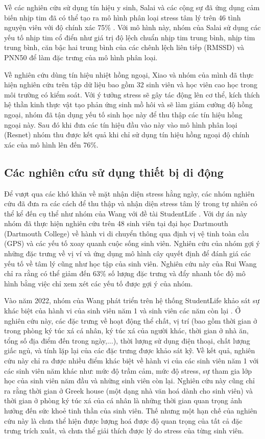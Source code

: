 Về các nghiên cứu sử dụng tín hiệu y sinh, Salai và các cộng sự đã ứng dụng cảm biến nhịp tim đã có thể tạo ra mô hình phân loại stress tâm lý trên 46 tình nguyện viên với độ chính xác 75\% \cite{stress_heartrate}. Với mô hình này, nhóm của Salai sử dụng các yếu tố nhịp tim cổ điển như giá trị độ lệch chuẩn nhịp tim trung bình, nhịp tim trung bình, căn bậc hai trung bình của các chênh lệch liên tiếp (RMSSD) và PNN50 để làm đặc trưng của mô hình phân loại.

Về nghiên cứu dùng tín hiệu nhiệt hồng ngoại, Xiao và nhóm của mình đã thực hiện nghiên cứu trên tập dữ liệu bao gồm 32 sinh viên và học viên cao học \cite{Stress_thermo} trong môi trường có kiểm soát. Với ý tưởng stress sẽ gây tác động lên cơ thể, kích thích hệ thần kinh thực vật tạo phản ứng sinh mồ hôi và sẽ làm giảm cường độ hồng ngoại, nhóm đã tận dụng yếu tố sinh học này để thu thập các tín hiệu hồng ngoại này. Sau đó khi đưa các tín hiệu đầu vào này vào mô hình phân loại (Resnet) nhóm thu được kết quả khi chỉ sử dụng tín hiệu hồng ngoại độ chính xác của mô hình lên đến 76\%.

\subsection{Các nghiên cứu sử dụng thiết bị di động}
Để vượt qua các khó khăn về mặt nhận diện stress hằng ngày, các nhóm nghiên cứu \cite{student_life,student_life2,Muller,student_life4} đã đưa ra các cách để thu thập và nhận diện stress tâm lý trong tự nhiên có thể kể đến cụ thể như nhóm của Wang với đề tài StudentLife \cite{student_life}. Với dự án này nhóm đã thực hiện nghiên cứu trên 48 sinh viên tại đại học Dartmouth (Dartmouth College) về hành vi di chuyển thông qua định vị vệ tinh toàn cầu (GPS) và các yếu tố xoay quanh cuộc sống sinh viên. Nghiên cứu của nhóm gợi ý những đặc trưng về vị ví và ứng dụng mô hình cây quyết định để đánh giá các yếu tố về tâm lý cũng như học tập của sinh viên. Nghiên cứu này của Rui Wang chỉ ra rằng có thể giảm đến 63\% số lượng đặc trưng và đẩy nhanh tốc độ mô hình bằng việc chỉ xem xét các yếu tố được gợi ý của nhóm.

Vào năm 2022, nhóm của Wang phát triển trên hệ thống StudentLife khảo sát sự khác biệt của hành vi của sinh viên năm 1 và sinh viên các năm còn lại \cite{student_life4}. Ở nghiên cứu này, các đặc trưng về hoạt động thể chất, vị trí (bao gồm thời gian ở trong phòng ký túc xá cá nhân, ký túc xá của người khác, thời gian ở nhà ăn, tổng số địa điểm đến trong ngày,...), thời lượng sử dụng điện thoại, chất lượng giấc ngủ, và tính lặp lại của các đặc trưng được khảo sát kỹ. Về kết quả, nghiên cứu này chỉ ra được nhiều điểm khác biệt về hành vi của các sinh viên năm 1 với các sinh viên năm khác như: mức độ trầm cảm, mức độ stress, sự tham gia lớp học của sinh viên năm đầu và những sinh viên còn lại. Nghiên cứu này cũng chỉ ra rằng thời gian ở Greek house (một dạng nhà văn hoá dành cho sinh viên) và thời gian ở phòng ký túc xá của cá nhân là những thời gian quan trọng ảnh hưởng đến sức khoẻ tinh thần của sinh viên. Thế nhưng một hạn chế của nghiên cứu này là chưa thể hiện được lượng hoá được độ quan trọng của tất cả đặc trưng trích xuất, và chưa thể giải thích được lý do stress của từng sinh viên.

